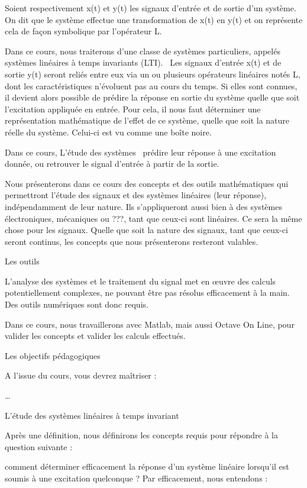 \documentclass[]{article}
\begin{document}
Soient respectivement x(t) et y(t) les signaux d'entrée et de sortie
d'un système. On dit que le système effectue une transformation de x(t)
en y(t) et on représente cela de façon symbolique par l'opérateur L.

Dans ce cours, nous traiterons d'une classe de systèmes particuliers,
appelés systèmes linéaires à temps invariants (LTI).~ Les signaux
d'entrée x(t) et de sortie y(t) seront reliés entre eux via un ou
plusieurs opérateurs linéaires notés L, dont les caractéristiques
n'évoluent pas au cours du temps. Si elles sont connues, il devient
alors possible de prédire la réponse en sortie du système quelle que
soit l'excitation appliquée en entrée. Pour cela, il nous faut
déterminer une représentation mathématique de l'effet de ce système,
quelle que soit la nature réelle du système. Celui-ci est vu comme une
boîte noire.

Dans ce cours, L'étude des systèmes~ prédire leur réponse à une
excitation donnée, ou retrouver le signal d'entrée à partir de la
sortie.~

Nous présenterons dans ce cours des concepts et des outils mathématiques
qui permettront l'étude des signaux et des systèmes linéaires (leur
réponse), indépendamment de leur nature. Ils s'appliqueront aussi bien à
des systèmes électroniques, mécaniques ou ???, tant que ceux-ci sont
linéaires. Ce sera la même chose pour les signaux. Quelle que soit la
nature des signaux, tant que ceux-ci seront continus, les concepts que
nous présenterons resteront valables.

Les outils

L'analyse des systèmes et le traitement du signal met en œuvre des
calculs potentiellement complexes, ne pouvant être pas résolus
efficacement à la main. Des outils numériques sont donc requis.

Dans ce cours, nous travaillerons avec Matlab, mais aussi Octave On
Line, pour valider les concepts et valider les calculs effectués.

Les objectifs pédagogiques

A l'issue du cours, vous devrez maîtriser :

\ldots{}

L'étude des systèmes linéaires à temps invariant

Après une définition, nous définirons les concepts requis pour répondre
à la question suivante :

comment déterminer efficacement la réponse d'un système linéaire
lorsqu'il est soumis à une excitation quelconque ? Par efficacement,
nous entendons :
\end{document}
